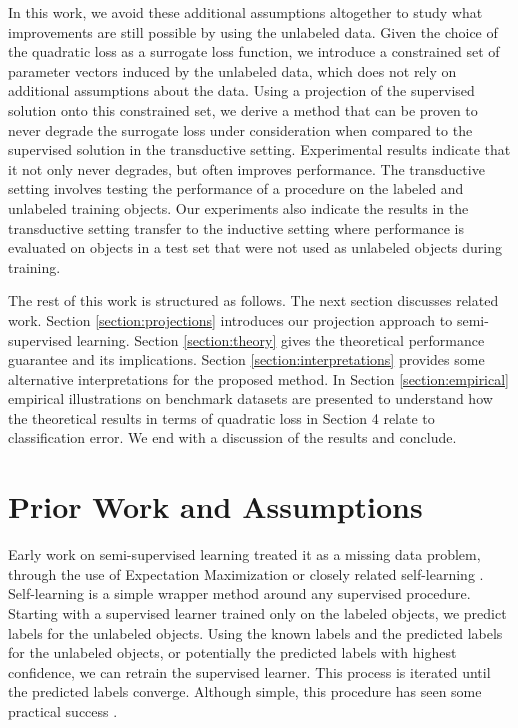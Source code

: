 \documentclass{article}
\begin{document}
In this work, we avoid these additional assumptions altogether to study what improvements are still possible by using the unlabeled data. Given the choice of the quadratic loss as a surrogate loss function, we introduce a constrained set of parameter vectors induced by the unlabeled data, which does not rely on additional assumptions about the data. Using a projection of the supervised solution onto this constrained set, we derive a method that can be proven to never degrade the surrogate loss under consideration when compared to the supervised solution in the transductive setting. Experimental results indicate that it not only never degrades, but often improves performance. The transductive setting involves testing the performance of a procedure on the labeled and unlabeled training objects. Our experiments also indicate the results in the transductive setting transfer to the inductive setting where performance is evaluated on objects in a test set that were not used as unlabeled objects during training.


The rest of this work is structured as follows. The next section discusses related work. Section \ref{section:projections} introduces our projection approach to semi-supervised learning. Section \ref{section:theory} gives the theoretical performance guarantee and its implications. Section \ref{section:interpretations} provides some alternative interpretations for the proposed method. In Section \ref{section:empirical} empirical illustrations on benchmark datasets are presented to understand how the theoretical results in terms of quadratic loss in Section 4 relate to classification error. We end with a discussion of the results and conclude.

\section{Prior Work and Assumptions}
Early work on semi-supervised learning treated it as a missing data problem, through the use of Expectation Maximization or closely related self-learning \citep{McLachlan1975}. Self-learning is a simple wrapper method around any supervised procedure. Starting with a supervised learner trained only on the labeled objects, we predict labels for the unlabeled objects. Using the known labels and the predicted labels for the unlabeled objects, or potentially the predicted labels with highest confidence, we can retrain the supervised learner. This process is iterated until the predicted labels converge. Although simple, this procedure has seen some practical success \citep{Nigam2000}.
\end{document}
